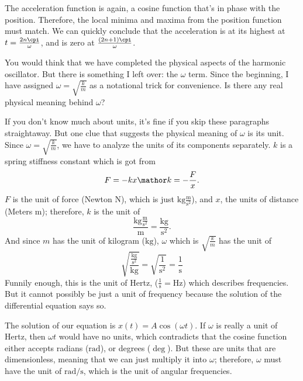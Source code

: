The acceleration function is again, a cosine function that's in phase with the position. Therefore, the local minima and maxima from the position function must match. We can quickly conclude that the acceleration is at its highest at $t = \frac{2n\cpi}{\omega}$, and is zero at $\frac{(2n + 1)\cpi}{\omega}$.

You would think that we have completed the physical aspects of the harmonic oscillator. But there is something I left over: the $\omega$ term. Since the beginning, I have assigned $\omega = \sqrt{\frac{k}{m}}$ as a notational trick for convenience. Is there any real physical meaning behind $\omega$?

If you don't know much about units, it's fine if you skip these paragraphs straightaway. But one clue that suggests the physical meaning of $\omega$ is its unit. Since $\omega = \sqrt{\frac{k}{m}}$, we have to analyze the units of its components separately. $k$ is a spring stiffness constant which is got from
\begin{equation}
	F = -kx \mathor k = -\frac{F}{x}.
\end{equation}
$F$ is the unit of force (Newton $\unit{\newton}$), which is just $\unit{\kilogram}\frac{\unit{\meter}}{\unit{\second^2}}$), and $x$, the units of distance (Meters $\unit{\meter}$); therefore, $k$ is the unit of
\begin{equation}
	\frac{\unit{\kilogram}\frac{\unit{\meter}}{\unit{\second^2}}}{\unit{\meter}} = \frac{\unit{\kilogram}}{\unit{\second^2}}.
\end{equation}
And since $m$ has the unit of kilogram ($\unit{\kilogram}$), $\omega$ which is $\sqrt{\frac{k}{m}}$ has the unit of
\begin{equation}
	\sqrt{\frac{\frac{\unit{\kilogram}}{\unit{\second^2}}}{\unit{\kilogram}}} = \sqrt{\frac{1}{\unit{\second^2}}} = \frac{1}{\unit{\second}}
\end{equation}
Funnily enough, this is the unit of Hertz, ($\frac{1}{\unit{\second}} = \unit{\hertz}$) which describes frequencies. But it cannot possibly be just a unit of frequency because the solution of the differential equation says so.

The solution of our equation is $x(t) = A\cos(\omega t)$. If $\omega$ is really a unit of Hertz, then $\omega t$ would have no units, which contradicts that the cosine function either accepts radians ($\unit{\radian}$), or degrees ($\unit{\deg}$). But these are units that are dimensionless, meaning that we can just multiply it into $\omega$; therefore, $\omega$ must have the unit of $\unit{\radian\per\second}$, which is the unit of angular frequencies.

